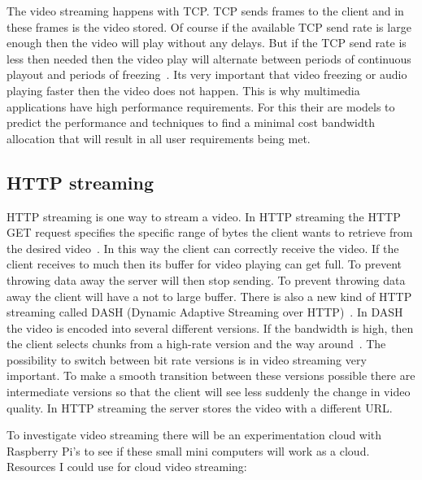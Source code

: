 \documentclass{sig-alternate-br}
\begin{document}
The video streaming happens with TCP. TCP sends frames to the client and in these frames is the video stored. Of course if the available TCP send rate is large enough then the video will play without any delays. But if the TCP send rate is less then needed then the video play will alternate between periods of continuous playout and periods of freezing~\cite{computer-networking}. Its very important that video freezing or audio playing faster then the video does not happen. This is why multimedia applications have high performance requirements. For this their are models to predict the performance and techniques to find a minimal cost bandwidth allocation that will result in all user requirements being met. 

\subsection{HTTP streaming}
HTTP streaming is one way to stream a video. In HTTP streaming the HTTP GET request specifies the specific range of bytes the client wants to retrieve from the desired video~\cite{computer-networking}. In this way the client can correctly receive the video. If the client receives to much then its buffer for video playing can get full. To prevent throwing data away the server will then stop sending. To prevent throwing data away the client will have a not to large buffer. \newline
There is also a new kind of HTTP streaming called DASH (Dynamic Adaptive Streaming over HTTP)~\cite{computer-networking}. In DASH the video is encoded into several different versions. If the bandwidth is high, then the client selects chunks from a high-rate version and the way around~\cite{computer-networking}. The possibility to switch between bit rate versions is in video streaming very important. To make a smooth transition between these versions possible there are intermediate versions so that the client will see less suddenly the change in video quality. In HTTP streaming the server stores the video with a different URL.   

To investigate video streaming there will be an experimentation cloud with Raspberry Pi's to see if these small mini computers will work as a cloud. 
Resources I could use for cloud video streaming:
\cite{g-streamer,raspberry-video,video-1080p, plissonneau:2012}
 
\end{document}
